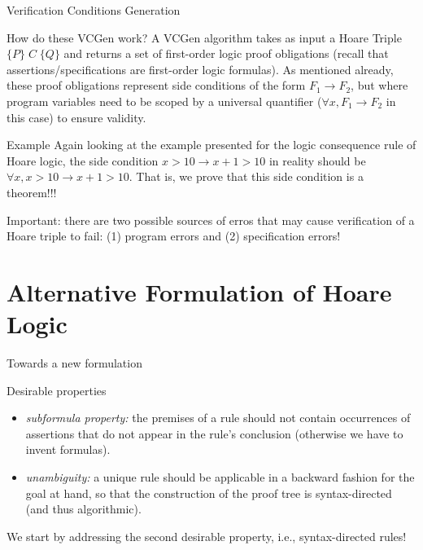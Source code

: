 \documentclass[aspectratio=169]{beamer}
\begin{document}
\begin{slide}{Verification Conditions Generation}

\begin{block}{How do these VCGen work?}
  A VCGen algorithm takes as input a Hoare Triple $\{P\}\;C\;\{Q\}$ and returns a set of first-order logic proof obligations (recall that assertions/specifications are first-order logic formulas). As mentioned already, these proof obligations represent side conditions of the form $F_1 \to F_2$, but where program variables need to be scoped by a universal quantifier ($\forall x, F_1 \to F_2$ in this case) to ensure validity. 
\end{block}

\begin{block}{Example}
  Again looking at the example presented for the logic consequence rule of Hoare logic, the side condition $x > 10 \to x + 1 > 10$ in reality should be $\forall x, x > 10 \to x + 1 > 10$. That is, we prove that this side condition is a theorem!!!
\end{block}

\alert{Important:} there are two possible sources of erros that may cause verification of a Hoare triple to fail: (1) program errors and (2) specification errors!

\end{slide}

\section*{Alternative Formulation of Hoare Logic}

\begin{slide}{Towards a new formulation}
\begin{block}{Desirable properties}
  \begin{itemize}
  \item \textit{subformula property:} the premises of a rule should not contain occurrences of assertions that do not appear in the rule's conclusion (otherwise we have to invent formulas).
  \item \textit{unambiguity:} a unique rule should be applicable in a backward fashion for the goal at hand, so that the construction of the proof tree is syntax-directed (and thus algorithmic). 
\end{itemize}
\end{block}

\alert{We start by addressing the second desirable property, i.e., syntax-directed rules!}
\end{slide}
\end{document}
